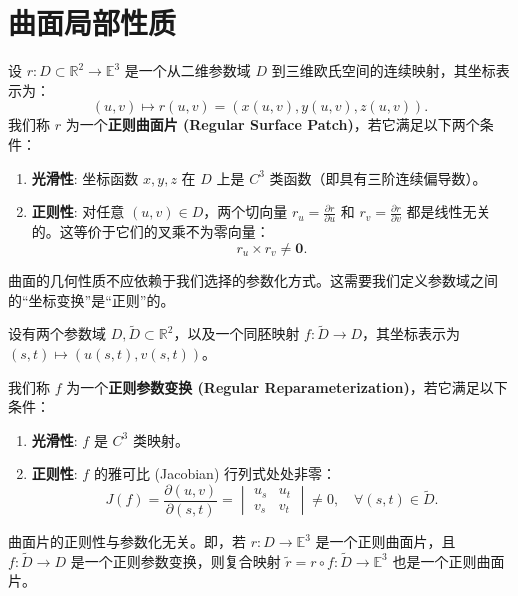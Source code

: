 \documentclass[lang=cn,10pt,thmcnt=section]{elegantbook}
\renewcommand{\vec}[1]{\mathbf{#1}}
\begin{document}
\section{曲面局部性质}
\begin{definition}[正则曲面片]
    设 $r: D \subset \mathbb{R}^2 \to \mathbb{E}^3$ 是一个从二维参数域 $D$ 到三维欧氏空间的连续映射，其坐标表示为：
    \[
    (u,v) \mapsto r(u,v) = (x(u,v), y(u,v), z(u,v)).
    \]
    我们称 $r$ 为一个\textbf{正则曲面片 (Regular Surface Patch)}，若它满足以下两个条件：
    \begin{enumerate}
        \item \textbf{光滑性}: 坐标函数 $x, y, z$ 在 $D$ 上是 $C^3$ 类函数（即具有三阶连续偏导数）。
        \item \textbf{正则性}: 对任意 $(u,v) \in D$，两个切向量 $r_u = \frac{\partial r}{\partial u}$ 和 $r_v = \frac{\partial r}{\partial v}$ 都是线性无关的。这等价于它们的叉乘不为零向量：
        \[
        r_u \times r_v \neq \vec{0}.
        \]
    \end{enumerate}
\end{definition}

曲面的几何性质不应依赖于我们选择的参数化方式。这需要我们定义参数域之间的“坐标变换”是“正则”的。

\begin{definition}[正则参数变换]
    设有两个参数域 $D, \widetilde{D} \subset \mathbb{R}^2$，以及一个同胚映射 $f: \widetilde{D} \to D$，其坐标表示为 $(s,t) \mapsto (u(s,t), v(s,t))$。
    
    我们称 $f$ 为一个\textbf{正则参数变换 (Regular Reparameterization)}，若它满足以下条件：
    \begin{enumerate}
        \item \textbf{光滑性}: $f$ 是 $C^3$ 类映射。
        \item \textbf{正则性}: $f$ 的雅可比 (Jacobian) 行列式处处非零：
        \[
        J(f) = \frac{\partial (u,v)}{\partial (s,t)} = \begin{vmatrix} u_s & u_t \\ v_s & v_t \end{vmatrix} \neq 0, \quad \forall (s,t) \in \widetilde{D}.
        \]
    \end{enumerate}
\end{definition}

\begin{proposition}
    曲面片的正则性与参数化无关。即，若 $r: D \to \mathbb{E}^3$ 是一个正则曲面片，且 $f: \widetilde{D} \to D$ 是一个正则参数变换，则复合映射 $\tilde{r} = r \circ f: \widetilde{D} \to \mathbb{E}^3$ 也是一个正则曲面片。
\end{proposition}
\end{document}
